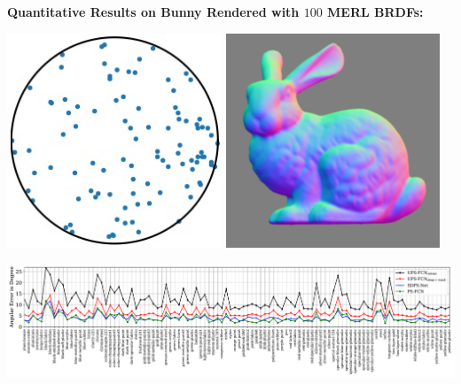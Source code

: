 \documentclass[landscape,a0paper,fontscale=0.292]{baposter}
\begin{document}
\begin{poster}
{    \vspace{0.7em}
    \textbf{\color{blue}Quantitative Results on {\sc Bunny} Rendered with $100$ MERL BRDFs:} \\
    \vspace{-1.0em}
    \begin{minipage}[t]{0.23\textwidth}
        \vspace{-9.5em}
        \begin{center}
            \includegraphics[width=0.48\textwidth]{images/MERL_directions.jpg}
            \includegraphics[width=0.48\textwidth]{images/bunny_normal.png}\\
            \vspace{-0.5em}
        \end{center}
    \end{minipage}
    \begin{minipage}[t]{0.76\textwidth}
        \begin{center}
            \includegraphics[width=\textwidth]{images/Bunny_100MERL.pdf}
        \end{center}
    \end{minipage}

}
\end{poster}
\end{document}
